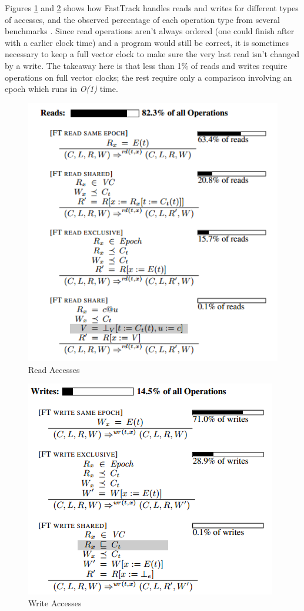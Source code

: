 \documentclass{acm_proc_article-sp}
\begin{document}
Figures \ref{read} and \ref{write} shows how FastTrack handles reads and writes for different types of accesses, and the observed percentage of each operation type from several benchmarks \cite{Flanagan2009}. Since read operations aren't always ordered (one could finish after with a earlier clock time) and a program would still be correct, it is sometimes necessary to keep a full vector clock to make sure the very last read isn't changed by a write. The takeaway here is that less than 1\% of reads and writes require operations on full vector clocks; the rest require only a comparison involving an epoch which runs in \emph{O(1)} time. 

 \begin{figure}[h]
    \centering
    \includegraphics[scale=.4]{fast_read_new}
	\caption{Read Accesses\label{read}}
 \end{figure}
\begin{figure}[h]
	\centering
    \includegraphics[scale=.4]{fast_write_new}
\caption{Write Accesses\label{write}}
  \end{figure}
\end{document}
